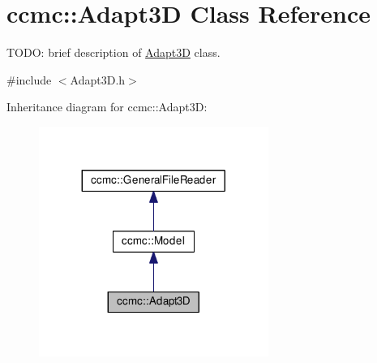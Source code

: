 \hypertarget{classccmc_1_1_adapt3_d}{\section{ccmc\-:\-:Adapt3\-D Class Reference}
\label{classccmc_1_1_adapt3_d}
}


T\-O\-D\-O\-: brief description of \hyperlink{classccmc_1_1_adapt3_d}{Adapt3\-D} class.  




{\ttfamily \#include $<$Adapt3\-D.\-h$>$}



Inheritance diagram for ccmc\-:\-:Adapt3\-D\-:
\nopagebreak
\begin{figure}[H]
\begin{center}
\leavevmode
\includegraphics[width=212pt]{classccmc_1_1_adapt3_d__inherit__graph}
\end{center}
\end{figure}


